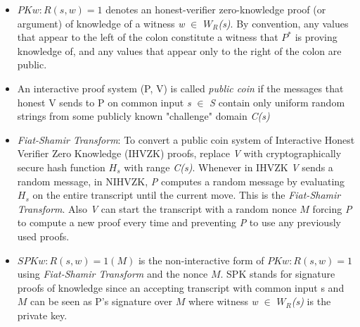 \documentclass[a4paper]{article}
\begin{document}
\begin{itemize}
  \item $PK{w : R(s,w) = 1}$ denotes an honest-verifier zero-knowledge proof (or argument) of knowledge of a witness \textit{w} $\in$ \textit{$W_R$(s)}. By convention, any values that appear to the left of the colon constitute a witness that ${P^{*}}$ is proving knowledge of, and any values that appear only to the right of the colon are public.
  \item An interactive proof system (P, V) is called \emph{public coin} if the messages that honest V sends to P on common input \textit{s} $\in$ \textit{S} contain only uniform random strings from some publicly known "challenge" domain \textit{C(s)} 
  \item \emph{Fiat-Shamir Transform}: To convert a public coin system of Interactive Honest Verifier Zero Knowledge (IHVZK) proofs, replace \textit{V} with cryptographically secure hash function $H_s$ with range \textit{C(s)}. Whenever in IHVZK \textit{V} sends a random message, in NIHVZK, \textit{P} computes a random message by evaluating $H_s$ on the entire transcript until the current move. This is the \emph{Fiat-Shamir Transform}. Also \textit{V} can start the transcript with a random nonce $M$ forcing \textit{P} to compute a new proof every time and preventing \textit{P} to use any previously used proofs.
  \item $SPK{w : R(s,w) = 1}(M)$ is the non-interactive form of $PK{w : R(s,w) = 1}$ using \emph{Fiat-Shamir Transform} and the nonce $M$. SPK stands for signature proofs of knowledge since an accepting transcript with common input s and $M$ can be seen as P's signature over $M$ where witness \textit{w} $\in$ \textit{$W_R$(s)} is the private key. 
\end{itemize}
\end{document}
